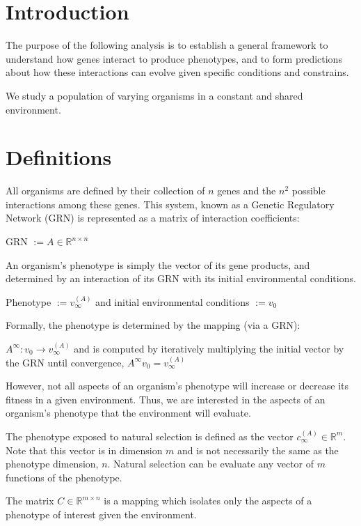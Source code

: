 \documentclass[a4paper,12pt]{article}
\begin{document}
\section{Introduction}

The purpose of the following analysis is to establish a general framework to understand how genes interact to produce phenotypes, and to form predictions about how these interactions can evolve given specific conditions and constrains. 

We study a population of varying organisms in a constant and shared environment.  

\section{Definitions}

All organisms are defined by their collection of $n$ genes and the $n^{2}$ possible interactions among these genes. This system, known as a Genetic Regulatory Network (GRN) is represented as a matrix of interaction coefficients:

GRN $:= A \in \mathbb{R}^{n \times n}$ 

An organism's phenotype is simply the vector of its gene products, and determined by an interaction of its GRN with its initial environmental conditions.

Phenotype $:= v_{\infty}^{(A)}$ and initial environmental conditions $:= v_{0}$

Formally, the phenotype is determined by the mapping (via a GRN): 

$A^{\infty}: v_{0} \rightarrow v_{\infty}^{(A)}$ and is computed by iteratively multiplying the initial vector by the GRN until convergence, $A^{\infty}v_{0} = v_{\infty}^{(A)}$

However, not all aspects of an organism's phenotype will increase or decrease its fitness in a given environment. Thus, we are interested in the aspects of an organism's phenotype that the environment will evaluate. 

The phenotype exposed to natural selection is defined as the vector $c_{\infty}^{(A)} \in \mathbb{R}^{m}$.
Note that this vector is in dimension $m$ and is not necessarily the same as the phenotype dimension, $n$. Natural selection can be evaluate any vector of $m$ functions of the phenotype. 

The matrix $C \in \mathbb{R}^{m \times n}$ is a mapping which isolates only the aspects of a phenotype of interest given the environment. 
\end{document}
